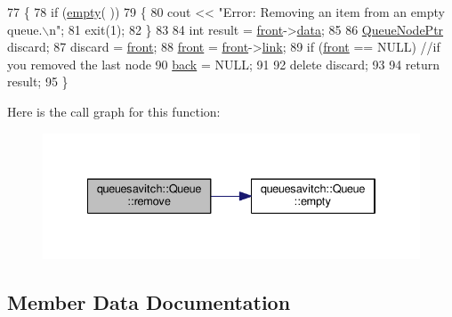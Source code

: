 \begin{DoxyCode}
77    \{
78       \textcolor{keywordflow}{if} (\hyperlink{classqueuesavitch_1_1Queue_a557c2aefa6d1c51d42a1563dab0e2cc0}{empty}( ))
79       \{
80          cout << \textcolor{stringliteral}{"Error: Removing an item from an empty queue.\(\backslash\)n"};
81          exit(1);
82       \}
83 
84       \textcolor{keywordtype}{int} result = \hyperlink{classqueuesavitch_1_1Queue_ac30555d398c28ad9b72f9d9b05c1ddf6}{front}->\hyperlink{structqueuesavitch_1_1QueueNode_a4fd17a591c8510ed1118d3c4cb67b320}{data};
85 
86       \hyperlink{namespacequeuesavitch_a3a9d48cafb7ea2049936da3b05a10209}{QueueNodePtr} discard;
87       discard = \hyperlink{classqueuesavitch_1_1Queue_ac30555d398c28ad9b72f9d9b05c1ddf6}{front};
88       \hyperlink{classqueuesavitch_1_1Queue_ac30555d398c28ad9b72f9d9b05c1ddf6}{front} = \hyperlink{classqueuesavitch_1_1Queue_ac30555d398c28ad9b72f9d9b05c1ddf6}{front}->\hyperlink{structqueuesavitch_1_1QueueNode_add6ebeca47fc7ab55c99a33827cb68c4}{link};
89       \textcolor{keywordflow}{if} (\hyperlink{classqueuesavitch_1_1Queue_ac30555d398c28ad9b72f9d9b05c1ddf6}{front} == NULL) \textcolor{comment}{//if you removed the last node                                               
                                                                                                            }
90          \hyperlink{classqueuesavitch_1_1Queue_a2759a808c5c9abe7d1c53cc8ade3f5a9}{back} = NULL;
91 
92       \textcolor{keyword}{delete} discard;
93 
94       \textcolor{keywordflow}{return} result;
95    \}
\end{DoxyCode}


Here is the call graph for this function\+:
\nopagebreak
\begin{figure}[H]
\begin{center}
\leavevmode
\includegraphics[width=334pt]{classqueuesavitch_1_1Queue_a607e9543f593526aee0d6a403a4ce775_cgraph}
\end{center}
\end{figure}




\subsection{Member Data Documentation}
